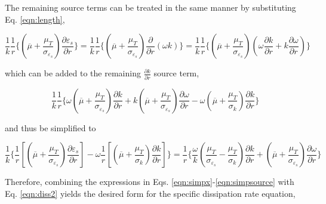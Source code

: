 	The remaining source terms can be treated in the same manner by substituting Eq. \ref{eqn:length}, 

\begin{displaymath}
	\frac{1}{k}\frac{1}{r}\Big\{(\overline{\mu} + \frac{\mu_T}{\sigma_{\varepsilon_s}})
	\frac{\partial \varepsilon_s}{\partial r}\Big\} = \frac{1}{k}\frac{1}{r}\Big\{(\overline{\mu} 
	+ \frac{\mu_T}{\sigma_{\varepsilon_s}})\frac{\partial}{\partial r}(\omega k)\Big\} = \frac{1}{k} 
	\frac{1}{r}\Big\{(\overline{\mu} + \frac{\mu_T}{\sigma_{\varepsilon_s}})
	(\omega \frac{\partial k}{\partial r} + k \frac{\partial \omega}{\partial r})\Big\}
\end{displaymath}
	
	which can be added to the remaining $\frac{\partial k}{\partial r}$ source term,

\begin{displaymath}
	\frac{1}{k}\frac{1}{r}\Big\{\omega(\overline{\mu} + \frac{\mu_T}{\sigma_{\varepsilon_s}}) \frac{\partial k}{\partial r}
	+ k(\overline{\mu} + \frac{\mu_T}{\sigma_{\varepsilon_s}}) \frac{\partial \omega}{\partial r}
 	- \omega(\overline{\mu} + \frac{\mu_T}{\sigma_k})\frac{\partial k}{\partial r}\Big\} 
\end{displaymath}
	
	and thus be simplified to 

\begin{equation}
	\frac{1}{k}\Big\{\frac{1}{r}[(\overline{\mu} + \frac{\mu_T}{\sigma_{\varepsilon_s}})
	\frac{\partial \varepsilon_s}{\partial r}] - \omega\frac{1}{r}[(\overline{\mu} + \frac{\mu_T}{\sigma_k})
	\frac{\partial k}{\partial r}] \Big\} = \frac{1}{r}\Big\{\frac{\omega}{k}(\frac{\mu_T}{\sigma_{\varepsilon_s}}
	- \frac{\mu_T}{\sigma_k})\frac{\partial k}{\partial r} + (\overline{\mu} + \frac{\mu_T}{\sigma_{\varepsilon_s}}) 
	\frac{\partial \omega}{\partial r}\Big\}
\label{eqn:simpsource}
\end{equation}

	Therefore, combining the expressions in Eqs. \ref{eqn:simpx}-\ref{eqn:simpsource} with Eq. \ref{eqn:diss2} yields
the desired form for the specific dissipation rate equation,

